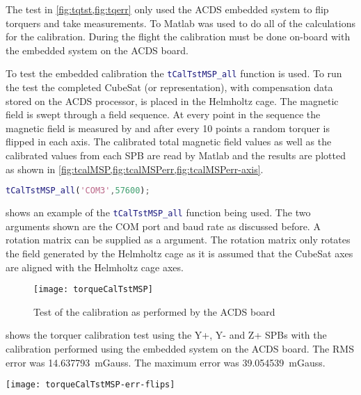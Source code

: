 The test in \cref{fig:tqtst,fig:tqerr} only used the \ac{ACDS} embedded system to flip torquers and take measurements. To Matlab was used to do all of the calculations for the calibration. During the flight the calibration must be done on-board with the embedded system on the \ac{ACDS} board.

To test the embedded calibration the \lstinline[style=code,language=Matlab]$tCalTstMSP_all$ function is used. To run the test the completed CubeSat (or representation), with compensation data stored on the \ac{ACDS} processor, is placed in the Helmholtz cage. The magnetic field is swept through a field sequence. At every point in the sequence the magnetic field is measured by and after every 10 points a random torquer is flipped in each axis. The calibrated total magnetic field values as well as the calibrated values from each \ac{SPB} are read by Matlab and the results are plotted as shown in \cref{fig:tcalMSP,fig:tcalMSPerr,fig:tcalMSPerr-axis}.

\begin{lstlisting}[style=code,caption={Testing the on-board calibration},label={lst:st-MSPcal},language=Matlab]
tCalTstMSP_all('COM3',57600);
\end{lstlisting}

 shows an example of the \lstinline[style=code,language=Matlab]$tCalTstMSP_all$ function being used. The two arguments shown are the COM port and baud rate as discussed before. A rotation matrix can be supplied as a  argument. The rotation matrix only rotates the field generated by the Helmholtz cage as it is assumed that the CubeSat axes are aligned with the Helmholtz cage axes.

\begin{figure}[!ht]
    \centering
    \texttt{[image: torqueCalTstMSP]}
    \caption{Test of the calibration as performed by the \ac{ACDS} board}
    \label{fig:tcalMSP}
\end{figure}

 shows the torquer calibration test using the Y+, Y- and Z+ \acp{SPB} with the calibration performed using the embedded system on the \ac{ACDS} board. The RMS error was 14.637793~mGauss. The maximum error was 39.054539~mGauss.

\begin{sidewaysfigure}
    \centering
    \texttt{[image: torqueCalTstMSP-err-flips]}
    \caption{Error plot for \cref{fig:tcalMSP} showing torquer states}
    \label{fig:tcalMSPerr}
\end{sidewaysfigure}

